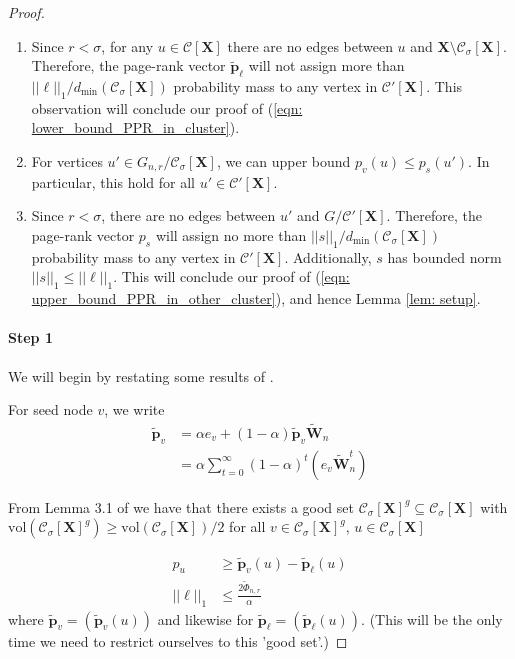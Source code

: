 \documentclass{article}
\newcommand{\vol}{\mathrm{vol}}
\newcommand{\1}{\mathbf{1}}
\newcommand{\pbf}{\mathbf{p}}
\newcommand{\Xbf}{\mathbf{X}}
\newcommand{\Wbf}{\mathbf{W}}
\newcommand{\Cset}{\mathcal{C}}
\newcommand{\Csig}{\Cset_{\sigma}}
\theoremstyle{aldenthm}
\begin{document}
\begin{proof}
\begin{enumerate}
		\item Since $r < \sigma$, for any $u \in \Cset[\Xbf]$ there are no edges between $u$ and $\Xbf \setminus \Csig[\Xbf]$. Therefore, the page-rank vector $\widetilde{\pbf}_{\ell}$ will not assign more than $||\ell||_1 / d_{\min}(\Csig[\Xbf])$ probability mass to any vertex in $\Cset'[\Xbf]$. This observation will conclude our proof of (\ref{eqn: lower_bound_PPR_in_cluster}).
		\item For vertices $u' \in G_{n,r} / \Csig[\Xbf]$, we can upper bound $p_v(u) \leq p_s(u')$. In particular, this hold for all $u' \in \Cset'[\Xbf]$.
		\item Since $r < \sigma$, there are no edges between $u'$ and $G / \Cset'[\Xbf]$. Therefore, the page-rank vector $p_{s}$ will assign no more than $||s||_1 / d_{\min}(\Csig[\Xbf])$ probability mass to any vertex in $\Cset'[\Xbf]$. Additionally, $s$ has bounded norm $||s||_1 \leq ||\ell||_1$. This will conclude our proof of (\ref{eqn: upper_bound_PPR_in_other_cluster}), and hence Lemma \ref{lem: setup}.
	\end{enumerate}
	
	\paragraph{Step 1}
	We will begin by restating some results of \cite{zhu2013}.
	
	For seed node $v$, we write
	\begin{align} \label{eqn: page_rank_body}
	\widetilde{\pbf}_v & = \alpha e_v + (1 - \alpha) \widetilde{\pbf}_v \widetilde{\Wbf}_n \\
	& = \alpha \sum_{t = 0}^{\infty} (1 - \alpha)^t \left(e_v \widetilde{\Wbf}_n^t \right)
	\end{align}
	
	From Lemma 3.1 of \cite{zhu2013} we have that there exists a good set $\Csig[\Xbf]^g \subseteq \Csig[\Xbf]$ with $\vol(\Csig[\Xbf]^g) \geq \vol(\Csig[\Xbf])/2$ for all $v \in \Csig[\Xbf]^g$, $u \in \Csig[\Xbf]$
	
	\begin{align} \label{eqn: zhu_body}
	p_u & \geq \widetilde{\pbf}_v(u) - \widetilde{\pbf}_{\ell}(u) \nonumber \\
	||\ell||_1 & \leq \frac{2 \widetilde{\Phi}_{n,r}}{\alpha}
	\end{align}
	where $\widetilde{\pbf}_v = (\widetilde{\pbf}_v(u))$ and likewise for $\widetilde{\pbf}_{\ell} = (\widetilde{\pbf}_{\ell}(u))$. (This will be the only time we need to restrict ourselves to this 'good set'.)
	

\end{proof}
\end{document}
